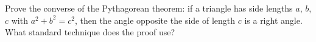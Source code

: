 Prove the converse of the Pythagorean theorem: if a triangle has side lengths \(a\), \(b\), \(c\) with \(a^2+b^2=c^2\), then the angle opposite the side of length \(c\) is a right angle. What standard technique does the proof use?
